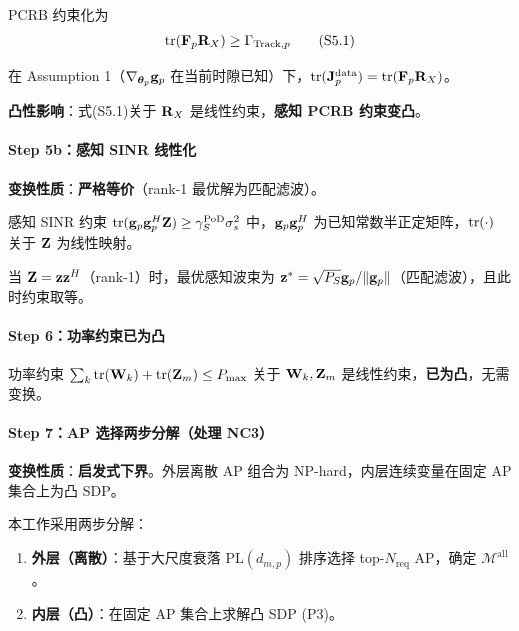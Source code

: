 PCRB 约束化为
\begin{equation}
\text{tr}(\mathbf{F}_p \mathbf{R}_X) \geq \Gamma_{\text{Track},p} \tag{S5.1}
\end{equation}

\begin{proposition}\label{prop:pcrb}
在 Assumption 1（$\nabla_{\boldsymbol{\theta}_p}\mathbf{g}_p$ 在当前时隙已知）下，$\text{tr}(\mathbf{J}_p^{\text{data}}) = \text{tr}(\mathbf{F}_p \mathbf{R}_X)$。
\end{proposition}

\textbf{凸性影响}：式(S5.1)关于 $\mathbf{R}_X$ 是线性约束，\textbf{感知 PCRB 约束变凸}。

\paragraph{Step 5b：感知 SINR 线性化}
\textbf{变换性质}：\textbf{严格等价}（rank-1 最优解为匹配滤波）。

感知 SINR 约束 $\text{tr}(\mathbf{g}_p\mathbf{g}_p^H \mathbf{Z}) \geq \gamma_S^{\text{PoD}} \sigma_s^2$ 中，$\mathbf{g}_p\mathbf{g}_p^H$ 为已知常数半正定矩阵，$\text{tr}(\cdot)$ 关于 $\mathbf{Z}$ 为线性映射。

\begin{proposition}\label{prop:sens_sinr}
当 $\mathbf{Z} = \mathbf{z}\mathbf{z}^H$（rank-1）时，最优感知波束为 $\mathbf{z}^* = \sqrt{P_S} \mathbf{g}_p/\|\mathbf{g}_p\|$（匹配滤波），且此时约束取等。
\end{proposition}

\paragraph{Step 6：功率约束已为凸}
功率约束 $\sum_k \text{tr}(\mathbf{W}_k) + \text{tr}(\mathbf{Z}_m) \leq P_{\max}$ 关于 $\mathbf{W}_k, \mathbf{Z}_m$ 是线性约束，\textbf{已为凸}，无需变换。

\paragraph{Step 7：AP 选择两步分解（处理 NC3）}
\textbf{变换性质}：\textbf{启发式下界}。外层离散 AP 组合为 NP-hard，内层连续变量在固定 AP 集合上为凸 SDP。

本工作采用两步分解：
\begin{enumerate}
    \item \textbf{外层（离散）}：基于大尺度衰落 $\text{PL}(d_{m,p})$ 排序选择 top-$N_{\text{req}}$ AP，确定 $\mathcal{M}^{\text{all}}$。
    \item \textbf{内层（凸）}：在固定 AP 集合上求解凸 SDP (P3)。
\end{enumerate}

